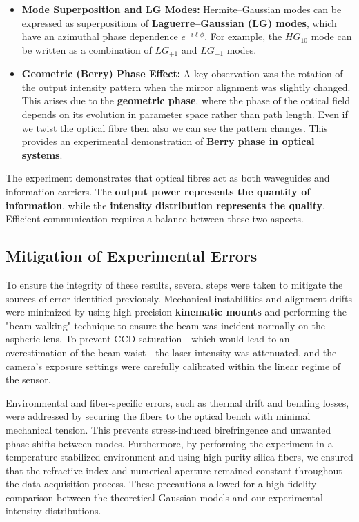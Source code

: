 \begin{itemize}
\item \textbf{Mode Superposition and LG Modes:}  
Hermite--Gaussian modes can be expressed as superpositions of \textbf{Laguerre--Gaussian (LG) modes}, which have an azimuthal phase dependence $e^{\pm i\ell\phi}$. For example, the $HG_{10}$ mode can be written as a combination of $LG_{+1}$ and $LG_{-1}$ modes.

\item \textbf{Geometric (Berry) Phase Effect:}  
A key observation was the rotation of the output intensity pattern when the mirror alignment was slightly changed. This arises due to the \textbf{geometric phase}, where the phase of the optical field depends on its evolution in parameter space rather than path length. Even if we twist the optical fibre then also we can see the pattern changes.
This provides an experimental demonstration of \textbf{Berry phase in optical systems}.
\end{itemize}
The experiment demonstrates that optical fibres act as both waveguides and information carriers. The \textbf{output power represents the quantity of information}, while the \textbf{intensity distribution represents the quality}. Efficient communication requires a balance between these two aspects.

\subsection{Mitigation of Experimental Errors}
To ensure the integrity of these results, several steps were taken to mitigate the sources of error identified previously. Mechanical instabilities and alignment drifts were minimized by using high-precision \textbf{kinematic mounts} and performing the "beam walking" technique to ensure the beam was incident normally on the aspheric lens. To prevent CCD saturation---which would lead to an overestimation of the beam waist---the laser intensity was attenuated, and the camera's exposure settings were carefully calibrated within the linear regime of the sensor.

Environmental and fiber-specific errors, such as thermal drift and bending losses, were addressed by securing the fibers to the optical bench with minimal mechanical tension. This prevents stress-induced birefringence and unwanted phase shifts between modes. Furthermore, by performing the experiment in a temperature-stabilized environment and using high-purity silica fibers, we ensured that the refractive index and numerical aperture remained constant throughout the data acquisition process. These precautions allowed for a high-fidelity comparison between the theoretical Gaussian models and our experimental intensity distributions.
